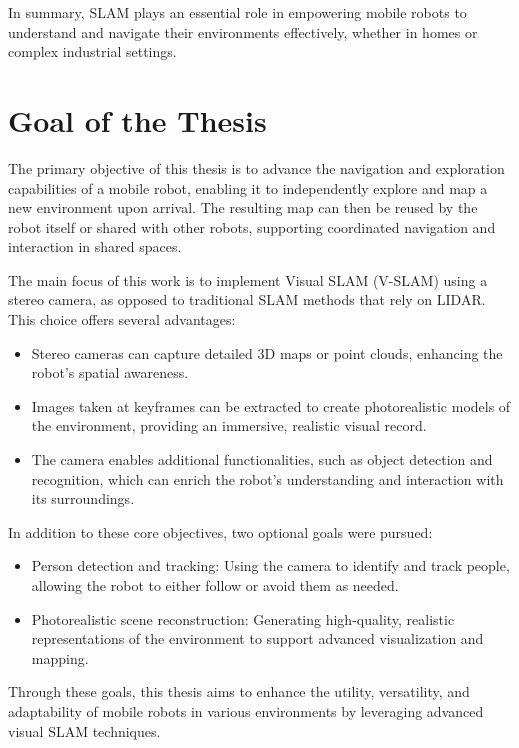 In summary, SLAM plays an essential role in empowering mobile robots to understand and navigate their environments effectively, whether in homes or complex industrial settings.


\section{Goal of the Thesis}

The primary objective of this thesis is to advance the navigation and exploration capabilities of a mobile robot, enabling it to independently explore and map a new environment upon arrival. The resulting map can then be reused by the robot itself or shared with other robots, supporting coordinated navigation and interaction in shared spaces.

The main focus of this work is to implement Visual SLAM (V-SLAM) using a stereo camera, as opposed to traditional SLAM methods that rely on LIDAR. This choice offers several advantages:
\begin{itemize}
\setlength\itemsep{0em}
    \item Stereo cameras can capture detailed 3D maps or point clouds, enhancing the robot's spatial awareness.
    \item Images taken at keyframes can be extracted to create photorealistic models of the environment, providing an immersive, realistic visual record.
    \item The camera enables additional functionalities, such as object detection and recognition, which can enrich the robot's understanding and interaction with its surroundings.
\end{itemize}

In addition to these core objectives, two optional goals were pursued:
\begin{itemize}
\setlength\itemsep{0em}
    \item Person detection and tracking: Using the camera to identify and track people, allowing the robot to either follow or avoid them as needed.
    \item Photorealistic scene reconstruction: Generating high-quality, realistic representations of the environment to support advanced visualization and mapping.
\end{itemize}

Through these goals, this thesis aims to enhance the utility, versatility, and adaptability of mobile robots in various environments by leveraging advanced visual SLAM techniques.


